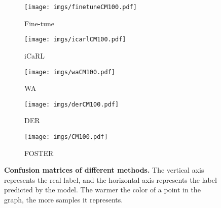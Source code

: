 \documentclass[runningheads]{llncs}
\begin{document}
\begin{figure}[t]
    \centering
    \begin{subfigure}[b]{0.48\linewidth}
    \texttt{[image: imgs/finetuneCM100.pdf]}
    \caption{Fine-tune}
    \label{fig:FinetuneCM}
  \end{subfigure}
  \hfill
   \begin{subfigure}[b]{0.48\linewidth}
    \texttt{[image: imgs/icarlCM100.pdf]}
    \caption{iCaRL}
    \label{fig:iCaRLCM}
  \end{subfigure}
  \hfill
   \begin{subfigure}[b]{0.48\linewidth}
    \texttt{[image: imgs/waCM100.pdf]}
    \caption{WA}
    \label{fig:WACM}
  \end{subfigure}
  \hfill
   \begin{subfigure}[b]{0.48\linewidth}
    \texttt{[image: imgs/derCM100.pdf]}
    \caption{DER}
    \label{fig:DERCM}
  \end{subfigure}
  \hfill
   \begin{subfigure}[b]{0.48\linewidth}
    \texttt{[image: imgs/CM100.pdf]}
    \caption{FOSTER}
    \label{fig:FOSTERCM}
  \end{subfigure}
    \caption{ \textbf{Confusion matrices of different methods.} The  vertical  axis   represents  the  real  label,  and  the  horizontal  axis represents the label predicted by the model. The warmer the color of a point in the graph, the more samples it represents.}
    \label{fig:compareCM}
\end{figure}
\end{document}
